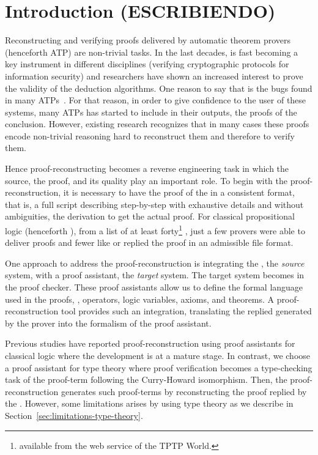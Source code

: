 \documentclass[../main.tex]{subfiles}
\begin{document}

\section{Introduction (ESCRIBIENDO)}
\label{sec:introduction}

Reconstructing and verifying proofs delivered by automatic theorem provers
(henceforth ATP) are non-trivial tasks.
In the last decades, \ATPs is fast becoming a key instrument in 
different disciplines (\eg verifying cryptographic protocols for information security) and researchers have shown an increased interest to prove the validity of the deduction algorithms.
One reason to say that is the bugs found in many ATPs~\cite{Keller2013,Bohme2011,Fleury2014}.
For that reason, in order to give confidence to the user of these systems,
many ATPs has started to include in their outputs, the proofs of the
conclusion. However, existing research recognizes that in many cases these proofs encode non-trivial reasoning
hard to reconstruct them and therefore to verify them.

Hence proof-reconstructing becomes a reverse engineering task
in which the source, the proof, and its quality play an important role.
To begin with the proof-reconstruction, it is necessary to have
the proof of the \ATP in a consistent format, that is, a full script 
describing step-by-step with exhaustive details and without ambiguities, the 
derivation to get the actual proof.  
For classical propositional logic (henceforth \CPL), from a list of at least forty\footnote{\ATPs 
available from the web
service  of the TPTP World.} \ATPs, just a few
provers were able to deliver proofs and fewer like  or \Metis 
replied the proof in an admissible file format.

One approach to address the proof-reconstruction 
is integrating the \ATP, the \emph{source} system, with a proof assistant, the 
\emph{target} system.
The target system becomes in the proof checker. These proof assistants allow 
us to define the formal language used in the proofs, \ie, operators, logic 
variables, axioms, and theorems. A proof-reconstruction tool provides such an
integration, translating the replied generated by the prover into the formalism of the proof assistant.

Previous studies have reported proof-reconstruction using proof assistants for classical logic where the development is at a mature stage.
In contrast, we choose a proof assistant for type theory
where proof verification becomes a type-checking task of the proof-term following the Curry-Howard isomorphism. Then, the proof-reconstruction generates such proof-terms by reconstructing the proof replied by the \ATP.
However, some limitations arises by using type theory as we describe in Section~\ref{sec:limitations-type-theory}.
\end{document}
